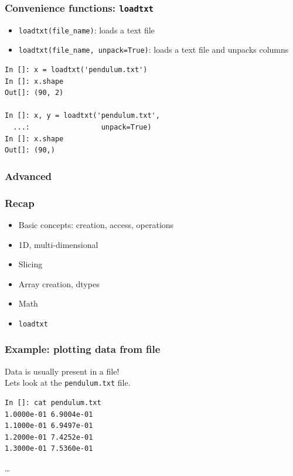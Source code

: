 \documentclass[14pt,compress]{beamer}
\newcommand{\typ}[1]{\lstinline{#1}}
\begin{document}
\begin{frame}[fragile]
    \frametitle{Convenience functions: \typ{loadtxt}}
  \begin{itemize}
      \item \typ{loadtxt(file_name)}: loads a text file 
      \item \typ{loadtxt(file_name, unpack=True)}: loads a text file and
          unpacks columns
  \end{itemize}
  \begin{lstlisting}
In []: x = loadtxt('pendulum.txt')
In []: x.shape
Out[]: (90, 2)

In []: x, y = loadtxt('pendulum.txt', 
  ...:                 unpack=True)
In []: x.shape
Out[]: (90,)
  \end{lstlisting}

\end{frame}


\begin{frame}[fragile]
  \frametitle{Advanced}
\end{frame}

\begin{frame}[fragile]
  \frametitle{Recap}
  \begin{itemize}
      \item Basic concepts: creation, access, operations
      \item 1D, multi-dimensional
      \item Slicing
      \item Array creation, dtypes
      \item Math
      \item \typ{loadtxt}
  \end{itemize}
\end{frame}

\begin{frame}[fragile]
\frametitle{Example: plotting data from file}
\alert{Data is usually present in a file!} \\
Lets look at the \typ{pendulum.txt} file.
\begin{lstlisting} 
In []: cat pendulum.txt 
1.0000e-01 6.9004e-01
1.1000e-01 6.9497e-01
1.2000e-01 7.4252e-01
1.3000e-01 7.5360e-01
\end{lstlisting}  %
\ldots
\end{frame}
\end{document}
